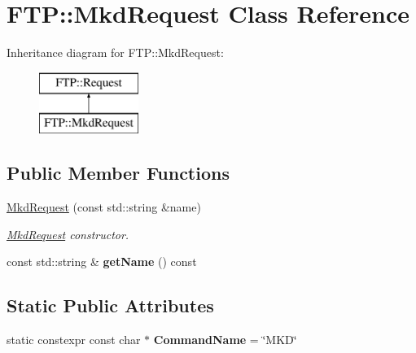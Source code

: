 \hypertarget{class_f_t_p_1_1_mkd_request}{\section{F\-T\-P\-:\-:Mkd\-Request Class Reference}
\label{class_f_t_p_1_1_mkd_request}
}
Inheritance diagram for F\-T\-P\-:\-:Mkd\-Request\-:\begin{figure}[H]
\begin{center}
\leavevmode
\includegraphics[height=2.000000cm]{class_f_t_p_1_1_mkd_request}
\end{center}
\end{figure}
\subsection*{Public Member Functions}
\begin{DoxyCompactItemize}
\item 
\hyperlink{class_f_t_p_1_1_mkd_request_a1c4565a8d7fbe2bc74ac4db2e2f4d4a9}{Mkd\-Request} (const std\-::string \&name)
\begin{DoxyCompactList}\small\item\em \hyperlink{class_f_t_p_1_1_mkd_request}{Mkd\-Request} constructor. \end{DoxyCompactList}\item 
\hypertarget{class_f_t_p_1_1_mkd_request_ae113af9dc74d782f22f51108186ec388}{const std\-::string \& {\bfseries get\-Name} () const }\label{class_f_t_p_1_1_mkd_request_ae113af9dc74d782f22f51108186ec388}

\end{DoxyCompactItemize}
\subsection*{Static Public Attributes}
\begin{DoxyCompactItemize}
\item 
\hypertarget{class_f_t_p_1_1_mkd_request_a0a5ac61b458cd123dcbbaa97143e2221}{static constexpr const char $\ast$ {\bfseries Command\-Name} = \char`\"{}M\-K\-D\char`\"{}}\label{class_f_t_p_1_1_mkd_request_a0a5ac61b458cd123dcbbaa97143e2221}

\end{DoxyCompactItemize}


